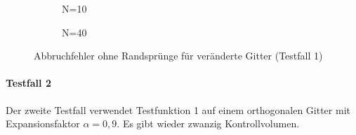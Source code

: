 \begin{figure}[ht]
\centering
   \begin{subfigure}{0.49\linewidth} \centering
  \caption{N=10}\label{fig:figA}
   \end{subfigure}
   \begin{subfigure}{0.49\linewidth} \centering
  \caption{N=40}\label{fig:figB}
   \end{subfigure}
   \caption{Abbruchfehler ohne Randsprünge für veränderte Gitter (Testfall 1)}
\end{figure}




\paragraph{Testfall 2}
Der zweite Testfall verwendet Testfunktion 1 auf einem orthogonalen Gitter mit
Expansionsfaktor $\alpha=0,9$. Es gibt wieder zwanzig Kontrollvolumen.

